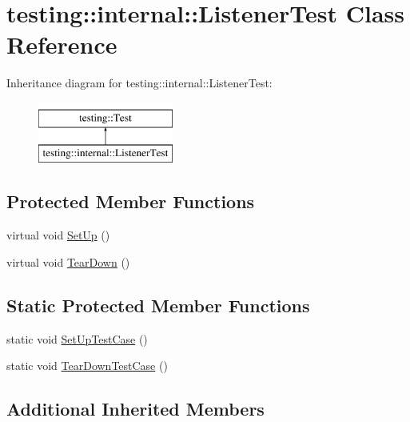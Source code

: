 \hypertarget{classtesting_1_1internal_1_1_listener_test}{\section{testing\-:\-:internal\-:\-:Listener\-Test Class Reference}
\label{classtesting_1_1internal_1_1_listener_test}
}
Inheritance diagram for testing\-:\-:internal\-:\-:Listener\-Test\-:\begin{figure}[H]
\begin{center}
\leavevmode
\includegraphics[height=2.000000cm]{classtesting_1_1internal_1_1_listener_test}
\end{center}
\end{figure}
\subsection*{Protected Member Functions}
\begin{DoxyCompactItemize}
\item 
virtual void \hyperlink{classtesting_1_1internal_1_1_listener_test_ace3dbe36b705ddf320518e6cdd919bc8}{Set\-Up} ()
\item 
virtual void \hyperlink{classtesting_1_1internal_1_1_listener_test_ad112535025d668e3ea14e71d8741c810}{Tear\-Down} ()
\end{DoxyCompactItemize}
\subsection*{Static Protected Member Functions}
\begin{DoxyCompactItemize}
\item 
static void \hyperlink{classtesting_1_1internal_1_1_listener_test_a7cbc298576e584b4021d0375204b7391}{Set\-Up\-Test\-Case} ()
\item 
static void \hyperlink{classtesting_1_1internal_1_1_listener_test_aa35b5f1c6235f0fe98aa2c7f35bb8fe1}{Tear\-Down\-Test\-Case} ()
\end{DoxyCompactItemize}
\subsection*{Additional Inherited Members}


